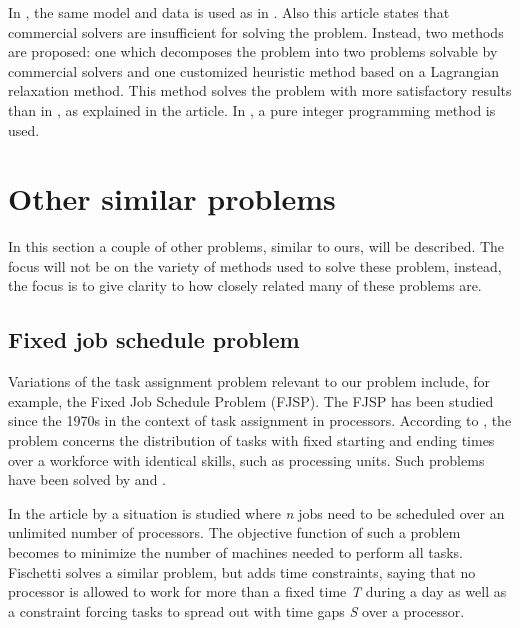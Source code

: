In \citet{hojati_2011}, the same model and data is used as in \citet{loucks_1991}. Also this article states that commercial solvers are insufficient for solving the problem. Instead, two methods are proposed: one which decomposes the problem into two problems solvable by commercial solvers and one customized heuristic method based on a Lagrangian relaxation method. This method solves the problem with more satisfactory results than in \citet{loucks_1991}, as explained in the article. In \citet{choi_hwang_park_2009}, a pure integer programming method is used.


\section{Other similar problems}\label{other}
In this section a couple of other problems, similar to ours, will be described. The focus will not be on the variety of methods used to solve these problem, instead, the focus is to give clarity to how closely related many of these problems are.

\subsection{Fixed job schedule problem}
Variations of the task assignment problem relevant to our problem include, for example, the Fixed Job Schedule Problem (FJSP). The FJSP has been studied since the 1970s in the context of task assignment in processors. According to \citet{krishnamoorthy_2012}, the problem concerns the distribution of tasks with fixed starting and ending times over a workforce with identical skills, such as processing units. Such problems have been solved by \citet{gertsbakh_1977} and \citet{fischetti_1992}.

In the article by \citet{gertsbakh_1977} a situation is studied where \textit{n} jobs need to be scheduled over an unlimited number of processors. The objective function of such a problem becomes to minimize the number of machines needed to perform all tasks. Fischetti solves a similar problem, but adds time constraints, saying that no processor is allowed to work for more than a fixed time \textit{T} during a day as well as a constraint forcing tasks to spread out with time gaps \textit{S} over a processor.

 	
